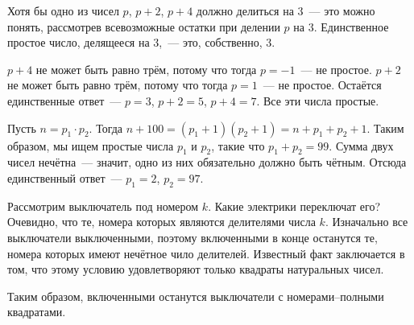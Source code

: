\begin{itemize}

\itA Хотя бы одно из чисел $p$, $p+2$, $p+4$ должно делиться на 3~— это можно понять, рассмотрев всевозможные остатки при делении $p$ на 3. Единственное простое число, делящееся на 3,~— это, собственно, 3.

$p+4$ не может быть равно трём, потому что тогда $p=-1$~— не простое. $p+2$ не может быть равно трём, потому что тогда $p=1$~— не простое. Остаётся единственные ответ~— $p=3$, $p+2 = 5$, $p+4 = 7$. Все эти числа простые.

\itB Пусть $n = p_1 \cdot p_2$. Тогда $n+100 = (p_1 + 1)(p_2 + 1) = n + p_1 + p_2 + 1$. Таким образом, мы ищем простые числа $p_1$ и $p_2$, такие что $p_1 + p_2 = 99$. Сумма двух чисел нечётна~— значит, одно из них обязательно должно быть чётным. Отсюда единственный ответ~— $p_1 = 2$, $p_2 = 97$.

\itC Рассмотрим выключатель под номером $k$. Какие электрики переключат его? Очевидно, что те, номера которых являются делителями числа $k$. Изначально все выключатели выключенными, поэтому включенными в конце останутся те, номера которых имеют нечётное чило делителей. Известный факт заключается в том, что этому условию удовлетворяют только квадраты натуральных чисел.

Таким образом, включенными останутся выключатели с номерами–полными квадратами.
\end{itemize}